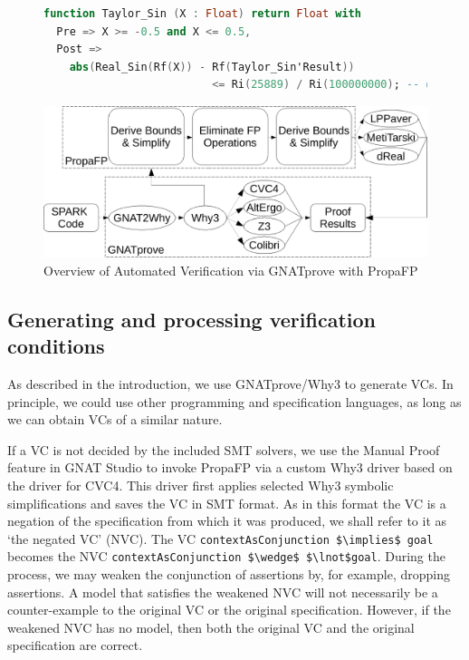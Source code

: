 \documentclass[runningheads]{llncs}
\begin{document}
\begin{figure}[t]

\begin{lstlisting}[caption=SPARK formal specification of \lstinline{Taylor_Sin}, language=ada, label={code:sineSpec}]
function Taylor_Sin (X : Float) return Float with
  Pre => X >= -0.5 and X <= 0.5,
  Post => 
    abs(Real_Sin(Rf(X)) - Rf(Taylor_Sin'Result)) 
                          <= Ri(25889) / Ri(100000000); -- 0.00025889
\end{lstlisting}
\end{figure}

\begin{figure}[tb]
  \centering
  \includegraphics[width=0.8\hsize]{figures/Spark_Toolchain_PropaFP-crop.pdf}
  \caption{Overview of Automated Verification via GNATprove with PropaFP}
  \label{fig:gnatprove}
\end{figure}

\subsection{Generating and processing verification conditions}\label{sec:GeneratingVCs} 

As described in the introduction, we use GNATprove/Why3 to generate VCs.
In principle, we could use other programming and specification languages, as long as we can obtain VCs of a similar nature.

If a VC is not decided by the included SMT solvers, we use the Manual Proof feature in GNAT Studio to invoke PropaFP via a custom Why3 driver based on the driver for CVC4.  This driver first applies selected Why3 symbolic simplifications and saves the VC in SMT format.
As in this format the VC is a negation of the specification from which it was produced, we shall refer to it as `the negated VC' (NVC).
The VC \lstinline{contextAsConjunction $\implies$ goal} becomes the NVC \lstinline{contextAsConjunction $\wedge$ $\lnot$goal}.
During the process, we may weaken the conjunction of assertions by, for example, dropping assertions.
A model that satisfies the weakened NVC will not necessarily be a counter-example to the original VC or the original specification.
However, if the weakened NVC has no model, then both the original VC and the original specification are correct.
\end{document}
